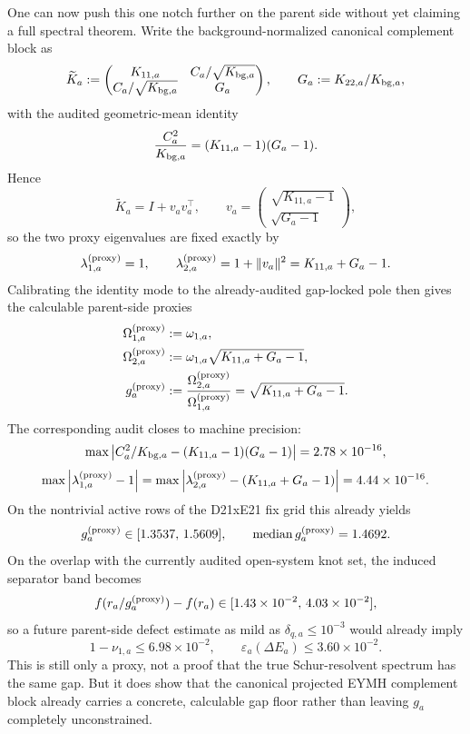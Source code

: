 \documentclass[aps,prd,onecolumn,notitlepage,nofootinbib,superscriptaddress,11pt,floatfix]{revtex4-2}
\begin{document}
One can now push this one notch further on the parent side without yet claiming a full spectral theorem. Write the background-normalized canonical complement block as
\[
\widetilde K_a:=
\begin{pmatrix}
K_{11,a} & C_a/\sqrt{K_{{\rm bg},a}}\\
C_a/\sqrt{K_{{\rm bg},a}} & G_a
\end{pmatrix},
\qquad
G_a:=K_{22,a}/K_{{\rm bg},a},
\]
with the audited geometric-mean identity
\[
\frac{C_a^2}{K_{{\rm bg},a}}=(K_{11,a}-1)(G_a-1).
\]
Hence
\[
\widetilde K_a = I + v_a v_a^\top,
\qquad
v_a=
\begin{pmatrix}
\sqrt{K_{11,a}-1}\\[2pt]
\sqrt{G_a-1}
\end{pmatrix},
\]
so the two proxy eigenvalues are fixed exactly by
\[
\lambda^{\rm(proxy)}_{1,a}=1,
\qquad
\lambda^{\rm(proxy)}_{2,a}=1+\|v_a\|^2=K_{11,a}+G_a-1.
\]
Calibrating the identity mode to the already-audited gap-locked pole then gives the calculable parent-side proxies
\[
\begin{aligned}
\Omega^{\rm(proxy)}_{1,a}&:=\omega_{1,a},\\
\Omega^{\rm(proxy)}_{2,a}&:=\omega_{1,a}\sqrt{K_{11,a}+G_a-1},\\
g^{\rm(proxy)}_a&:=\frac{\Omega^{\rm(proxy)}_{2,a}}{\Omega^{\rm(proxy)}_{1,a}}
=\sqrt{K_{11,a}+G_a-1}.
\end{aligned}
\]
The corresponding audit closes to machine precision:
\[
\max\left|C_a^2/K_{{\rm bg},a}-(K_{11,a}-1)(G_a-1)\right|=2.78\times10^{-16},
\]
\[
\max\left|\lambda^{\rm(proxy)}_{1,a}-1\right|
=
\max\left|\lambda^{\rm(proxy)}_{2,a}-(K_{11,a}+G_a-1)\right|
=4.44\times10^{-16}.
\]
On the nontrivial active rows of the D21xE21 fix grid this already yields
\[
g^{\rm(proxy)}_a\in[1.3537,\,1.5609],
\qquad
\mathrm{median}\,g^{\rm(proxy)}_a=1.4692.
\]
On the overlap with the currently audited open-system knot set, the induced separator band becomes
\[
f(r_a/g^{\rm(proxy)}_a)-f(r_a)\in[1.43\times10^{-2},\,4.03\times10^{-2}],
\]
so a future parent-side defect estimate as mild as $\delta_{q,a}\le 10^{-3}$ would already imply
\[
1-\nu_{1,a}\le 6.98\times10^{-2},
\qquad
\varepsilon_a(\Delta E_a)\le 3.60\times10^{-2}.
\]
This is still only a proxy, not a proof that the true Schur-resolvent spectrum has the same gap. But it does show that the canonical projected EYMH complement block already carries a concrete, calculable gap floor rather than leaving $g_a$ completely unconstrained.
\end{document}
